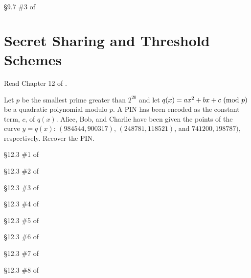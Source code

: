 \begin{problem}[10 points]
	\S 9.7 \#3 of \cite {tw}
\end{problem}

	\section{Secret Sharing and Threshold Schemes}

Read Chapter 12 of \cite{tw}.

\begin{problem}[10 points]
	Let $p$ be the smallest prime greater than $2^{20}$ and let $q(x) = ax^2+bx+c \mbox{\ $\left(\mathrm{mod}\ {p}\right)$}$ be a quadratic polynomial modulo $p$. A PIN has been encoded as the constant term, $c$, of $q(x)$. Alice, Bob, and Charlie have been given the points of the curve $y=q(x)$: $(984544, 900317)$, $(248781, 118521)$, and $741200, 198787)$, respectively. Recover the PIN.
\end{problem}

\begin{problem}[10 points]
	\S 12.3 \#1 of \cite {tw}
\end{problem}

\begin{problem}[10 points]
	\S 12.3 \#2 of \cite {tw}
\end{problem}

\begin{problem}[5 points]
	\S 12.3 \#3 of \cite {tw}
\end{problem}

\begin{problem}[10 points]
	\S 12.3 \#4 of \cite {tw}
\end{problem}

\begin{problem}[10 points]
	\S 12.3 \#5 of \cite {tw}
\end{problem}

\begin{problem}[15 points]
	\S 12.3 \#6 of \cite {tw}
\end{problem}

\begin{problem}[15 points]
	\S 12.3 \#7 of \cite {tw}
\end{problem}

\begin{problem}[10 points]
	\S 12.3 \#8 of \cite {tw}
\end{problem}

